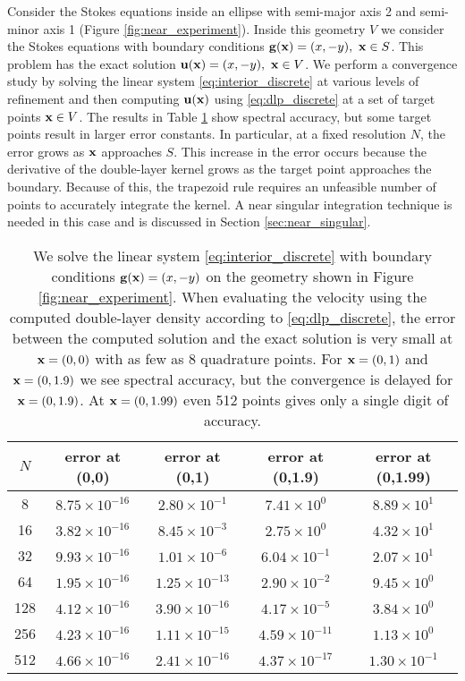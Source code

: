 Consider the Stokes equations inside an ellipse with semi-major axis 2 and semi-minor axis 1 (Figure \ref{fig:near_experiment}). Inside this geometry $V$ we consider the Stokes equations with boundary conditions $\mathbf{g}({\mathbf{x}}) = ( x, -y), ~{\mathbf{x}}\in S$. This problem has the exact solution ${\mathbf{u}}({\mathbf{x}}) = (x, -y),~{\mathbf{x}}\in V$. We perform a convergence study by solving the linear system \eqref{eq:interior_discrete} at various levels of refinement and then computing ${\mathbf{u}}({\mathbf{x}})$ using \eqref{eq:dlp_discrete} at a set of target points ${\mathbf{x}}\in V$. The results in Table \ref{tab:near_error} show spectral accuracy, but some target points result in larger error constants. In particular, at a fixed resolution $N$, the error grows as ${\mathbf{x}}$ approaches $S$. This increase in the error occurs because the derivative of the double-layer kernel grows as the target point approaches the boundary. Because of this, the trapezoid rule requires an unfeasible number of points to accurately integrate the kernel. A near singular integration technique is needed in this case and is discussed in Section \ref{sec:near_singular}. 


\begin{table}[!h]
\caption[Errors using the trapezoid rule]{We solve the linear system \eqref{eq:interior_discrete} with boundary conditions $\mathbf{g}({\mathbf{x}}) = ( x, -y )$ on the geometry shown in Figure \ref{fig:near_experiment}. When evaluating the velocity using the computed double-layer density according to \eqref{eq:dlp_discrete}, the error between the computed solution and the exact solution is very small at ${\mathbf{x}}= (0,0)$ with as few as 8 quadrature points. For ${\mathbf{x}}=(0,1)$ and ${\mathbf{x}}=(0,1.9)$ we see spectral accuracy, but the convergence is delayed for ${\mathbf{x}}=(0,1.9)$. At ${\mathbf{x}}= (0,1.99)$ even 512 points gives only a single digit of accuracy.}\label{tab:near_error}
\begin{center}
\begin{tabular}{c | c | c | c | c }
$N$  & error at (0,0) & error at (0,1) & error at (0,1.9) & error at (0,1.99)\\
\hline
8    & $8.75\times 10^{-16}$ & $2.80\times 10^{-1}$ & $7.41\times 10^0$ & $8.89\times 10^1$ \\
16  & $3.82\times 10^{-16}$ & $8.45\times 10^{-3}$ & $2.75\times 10^0$ & $4.32\times 10^1$ \\
32  & $9.93\times 10^{-16}$ & $1.01\times 10^{-6}$ & $6.04\times 10^{-1}$ & $2.07\times 10^1$ \\
64  & $1.95\times 10^{-16}$ & $1.25\times 10^{-13}$ & $2.90\times 10^{-2}$ & $9.45\times 10^0$ \\
128 & $4.12\times 10^{-16}$ & $3.90\times 10^{-16}$ & $4.17\times 10^{-5}$ & $3.84\times 10^0$\\
256 & $4.23\times 10^{-16}$ & $1.11\times 10^{-15}$ & $4.59\times 10^{-11}$ & $1.13\times 10^{0}$\\
512 & $4.66\times 10^{-16}$ & $2.41\times 10^{-16}$ & $4.37\times 10^{-17}$ & $1.30\times 10^{-1}$
\end{tabular}
\end{center}
\end{table}


